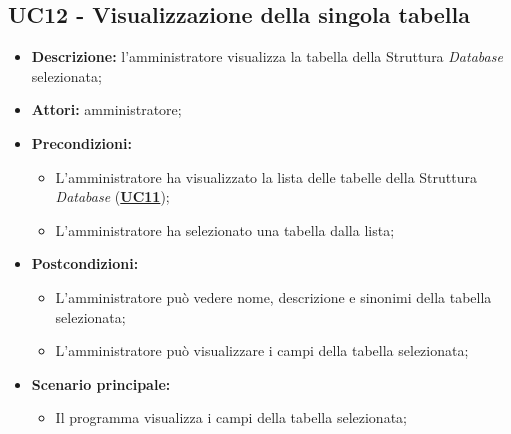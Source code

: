 \subsection{UC12 - Visualizzazione della singola tabella}
\label{sec:UC12}
\begin{itemize}
	\item \textbf{Descrizione:} l’amministratore visualizza la tabella della Struttura \textit{Database} selezionata;
	\item \textbf{Attori:} amministratore;
	\item \textbf{Precondizioni:} 
	\begin{itemize}
		\item L'amministratore ha visualizzato la lista delle tabelle della Struttura \textit{Database} (\hyperref[sec:UC11]{\textbf{UC11}});
		\item L'amministratore ha selezionato una tabella dalla lista;
	\end{itemize}
	\item \textbf{Postcondizioni:} 
	\begin{itemize}
		\item L'amministratore può vedere nome, descrizione e sinonimi della tabella selezionata;
		\item L'amministratore può visualizzare i campi della tabella selezionata;
	\end{itemize}
	\item \textbf{Scenario principale:} 
	\begin{itemize}
		\item Il programma visualizza i campi della tabella selezionata;
	\end{itemize}
\end{itemize}

